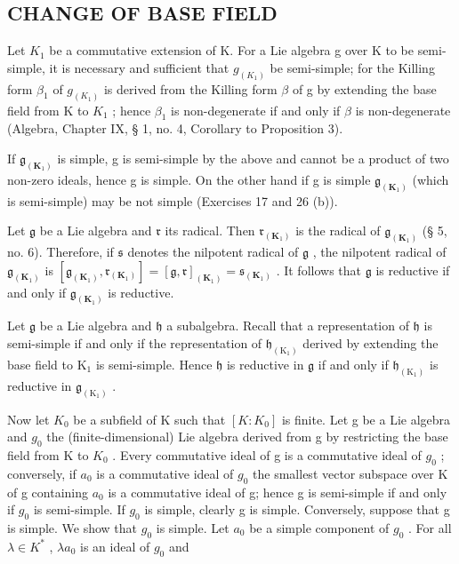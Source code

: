 \subsection{CHANGE OF BASE FIELD}

Let \(K_{1}\) be a commutative extension of K. For a Lie algebra g over K to be semi-simple, it is necessary and sufficient that \(g_{(K_{1})}\) be semi-simple; for the Killing form \(\beta_{1}\) of \(g_{(K_{1})}\) is derived from the Killing form \(\beta\) of g by extending the base field from K to \(K_{1}\) ; hence \(\beta_{1}\) is non-degenerate if and only if \(\beta\) is non-degenerate (Algebra, Chapter IX, § 1, no. 4, Corollary to Proposition 3).

If \(\mathfrak{g}_{(\mathbf{K}_{1})}\) is simple, g is semi-simple by the above and cannot be a product of two non-zero ideals, hence g is simple. On the other hand if g is simple \(\mathfrak{g}_{(\mathbf{K}_{1})}\) (which is semi-simple) may be not simple (Exercises 17 and 26 (b)).

Let \(\mathfrak{g}\) be a Lie algebra and \(\mathfrak{r}\) its radical. Then \(\mathfrak{r}_{(\mathbf{K}_1)}\) is the radical of \(\mathfrak{g}_{(\mathbf{K}_1)}\) (§ 5, no. 6). Therefore, if \(\mathfrak{s}\) denotes the nilpotent radical of \(\mathfrak{g}\) , the nilpotent radical of \(\mathfrak{g}_{(\mathbf{K}_1)}\) is \([\mathfrak{g}_{(\mathbf{K}_1)},\mathfrak{r}_{(\mathbf{K}_1)}] = [\mathfrak{g},\mathfrak{r}]_{(\mathbf{K}_1)} = \mathfrak{s}_{(\mathbf{K}_1)}\) . It follows that \(\mathfrak{g}\) is reductive if and only if \(\mathfrak{g}_{(\mathbf{K}_1)}\) is reductive.

Let \(\mathfrak{g}\) be a Lie algebra and \(\mathfrak{h}\) a subalgebra. Recall that a representation of \(\mathfrak{h}\) is semi-simple if and only if the representation of \(\mathfrak{h}_{(\mathrm{K}_1)}\) derived by extending the base field to \(\mathrm{K}_1\) is semi-simple. Hence \(\mathfrak{h}\) is reductive in \(\mathfrak{g}\) if and only if \(\mathfrak{h}_{(\mathrm{K}_1)}\) is reductive in \(\mathfrak{g}_{(\mathrm{K}_1)}\) .

Now let \(K_{0}\) be a subfield of K such that \([K:K_{0}]\) is finite. Let g be a Lie algebra and \(g_{0}\) the (finite-dimensional) Lie algebra derived from g by restricting the base field from K to \(K_{0}\) . Every commutative ideal of g is a commutative ideal of \(g_{0}\) ; conversely, if \(a_{0}\) is a commutative ideal of \(g_{0}\) the smallest vector subspace over K of g containing \(a_{0}\) is a commutative ideal of g; hence g is semi-simple if and only if \(g_{0}\) is semi-simple. If \(g_{0}\) is simple, clearly g is simple. Conversely, suppose that g is simple. We show that \(g_{0}\) is simple. Let \(a_{0}\) be a simple component of \(g_{0}\) . For all \(\lambda \in K^{*}\) , \(\lambda a_{0}\) is an ideal of \(g_{0}\) and

